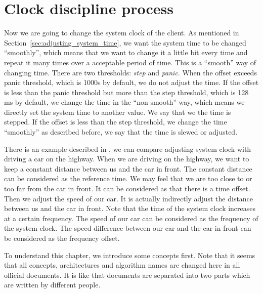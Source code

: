 

\chapter{Clock discipline process}%
\label{cha:clock_discipline_process}
Now we are going to change the system clock of the client. As mentioned in 
Section~\ref{sec:adjusting_system_time}, we want the system time to be changed
``smoothly'', which means that we want to change it a little bit every time and 
repeat it many times over a acceptable period of time. This is a ``smooth'' way
of changing time. There are two thresholds: \emph{step} and \emph{panic}. When
the offset exceeds panic threshold, which is 1000s by default, we do not adjust
the time. If the offset is less than the panic threshold but more than the step
threshold, which is 128 ms by default, we change the time in the ``non-smooth''
way, which means we directly set the system time to another value. We say that
we the time is stepped. If the offset is less than the step threshold, we
change the time ``smoothly'' as described before, we say that the time is
slewed or adjusted.

There is an example described in \cite{redbook}, we can compare adjusting
system clock with driving a car on the highway. When we are driving on the
highway, we want to keep a constant distance between us and the car in front.
The constant distance can be considered as the reference time. We may feel that
we are too close to or too far from the car in front. It can be considered as
that there is a time offset. Then we adjust the speed of our car. It is
actually indirectly adjust the distance between us and the car in front. Note
that the time of the system clock increases at a certain frequency. The speed
of our car can be considered as the frequency of the system clock. The speed
difference between our car and the car in front can be considered as the
frequency offset.

To understand this chapter, we introduce some concepts first. Note that it
seems that all concepts, architectures and algorithm names are changed here in
all official documents. It is like that documents are separated into two parts
which are written by different people.

